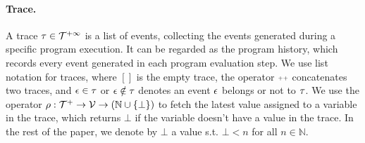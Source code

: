 \paragraph{Trace.}
%
A trace $\mathtt{\tau} \in \mathcal{T}^{+\infty}$ is a list of events, 
collecting the events generated during a specific program execution. 
It can be regarded as the program history, 
which records every event generated in each program evaluation step.
We use list notation for traces, where $[]$ is the empty trace,
the operator ${\scriptscriptstyle ++}$ concatenates two traces, and $\mathtt{\epsilon} \in \mathtt{\tau}$ or $\mathtt{\epsilon} \notin \mathtt{\tau}$ denotes an event $\mathtt{\epsilon}$ belongs or not to $\mathtt{\tau}$.
We use the operator $\rho : {\mathcal{T}^{+}}  \to \mathcal{V} \to(\mathbb{N} \cup \{\bot\})$ to fetch the latest value assigned to a variable in the trace, which returns $\bot$ if the variable doesn't have a value in the trace.
In the rest of the paper, we denote by $\bot$ a value s.t. $\bot < n $ for all $n \in \mathbb{N}$.
